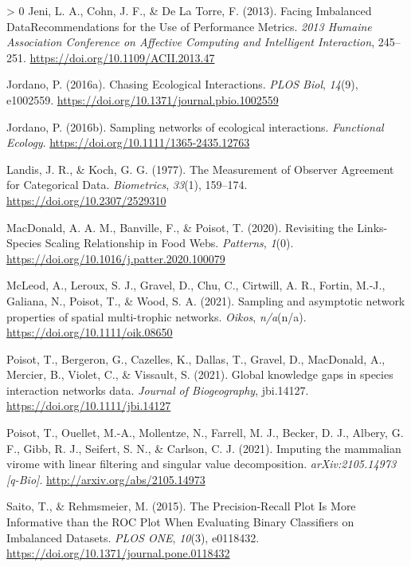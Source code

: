 \documentclass[11pt]{article}
\newlength{\cslhangindent}
\newenvironment{CSLReferences}[3] %
 {%
  \setlength{\parindent}{0pt}
  \ifodd #1 \everypar{\setlength{\hangindent}{\cslhangindent}}\ignorespaces\fi
  \ifnum #2 > 0
  \setlength{\parskip}{#2\baselineskip}
  \fi
 }%
 {}
\begin{document}
\begin{CSLReferences}{1}{0}
\leavevmode\hypertarget{ref-Jeni2013FacImb}{}%
Jeni, L. A., Cohn, J. F., \& De La Torre, F. (2013). Facing Imbalanced
DataRecommendations for the Use of Performance Metrics. \emph{2013
Humaine Association Conference on Affective Computing and Intelligent
Interaction}, 245--251. \url{https://doi.org/10.1109/ACII.2013.47}

\leavevmode\hypertarget{ref-Jordano2016ChaEco}{}%
Jordano, P. (2016a). Chasing Ecological Interactions. \emph{PLOS Biol},
\emph{14}(9), e1002559.
\url{https://doi.org/10.1371/journal.pbio.1002559}

\leavevmode\hypertarget{ref-Jordano2016SamNet}{}%
Jordano, P. (2016b). Sampling networks of ecological interactions.
\emph{Functional Ecology}. \url{https://doi.org/10.1111/1365-2435.12763}

\leavevmode\hypertarget{ref-Landis1977MeaObs}{}%
Landis, J. R., \& Koch, G. G. (1977). The Measurement of Observer
Agreement for Categorical Data. \emph{Biometrics}, \emph{33}(1),
159--174. \url{https://doi.org/10.2307/2529310}

\leavevmode\hypertarget{ref-MacDonald2020RevLin}{}%
MacDonald, A. A. M., Banville, F., \& Poisot, T. (2020). Revisiting the
Links-Species Scaling Relationship in Food Webs. \emph{Patterns},
\emph{1}(0). \url{https://doi.org/10.1016/j.patter.2020.100079}

\leavevmode\hypertarget{ref-McLeod2021SamAsy}{}%
McLeod, A., Leroux, S. J., Gravel, D., Chu, C., Cirtwill, A. R., Fortin,
M.-J., Galiana, N., Poisot, T., \& Wood, S. A. (2021). Sampling and
asymptotic network properties of spatial multi-trophic networks.
\emph{Oikos}, \emph{n/a}(n/a). \url{https://doi.org/10.1111/oik.08650}

\leavevmode\hypertarget{ref-Poisot2021GloKno}{}%
Poisot, T., Bergeron, G., Cazelles, K., Dallas, T., Gravel, D.,
MacDonald, A., Mercier, B., Violet, C., \& Vissault, S. (2021). Global
knowledge gaps in species interaction networks data. \emph{Journal of
Biogeography}, jbi.14127. \url{https://doi.org/10.1111/jbi.14127}

\leavevmode\hypertarget{ref-Poisot2021ImpMam}{}%
Poisot, T., Ouellet, M.-A., Mollentze, N., Farrell, M. J., Becker, D.
J., Albery, G. F., Gibb, R. J., Seifert, S. N., \& Carlson, C. J.
(2021). Imputing the mammalian virome with linear filtering and singular
value decomposition. \emph{arXiv:2105.14973 {[}q-Bio{]}}.
\url{http://arxiv.org/abs/2105.14973}

\leavevmode\hypertarget{ref-Saito2015PrePlo}{}%
Saito, T., \& Rehmsmeier, M. (2015). The Precision-Recall Plot Is More
Informative than the ROC Plot When Evaluating Binary Classifiers on
Imbalanced Datasets. \emph{PLOS ONE}, \emph{10}(3), e0118432.
\url{https://doi.org/10.1371/journal.pone.0118432}


\end{CSLReferences}
\end{document}
